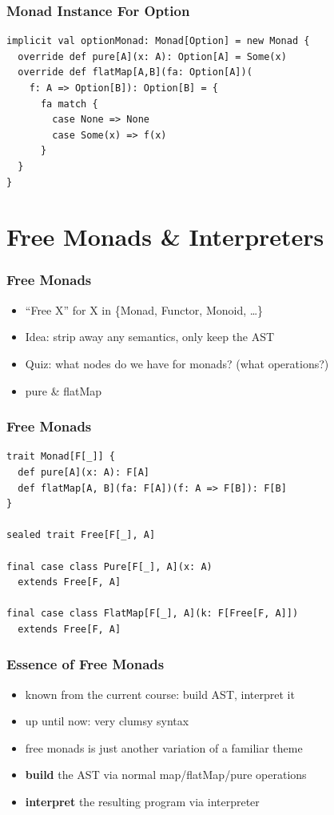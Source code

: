 \documentclass{beamer}
\begin{document}
\begin{frame}[fragile]
  \frametitle{Monad Instance For Option}
\begin{verbatim}
implicit val optionMonad: Monad[Option] = new Monad {
  override def pure[A](x: A): Option[A] = Some(x)
  override def flatMap[A,B](fa: Option[A])(
    f: A => Option[B]): Option[B] = {
      fa match {
        case None => None
        case Some(x) => f(x)
      }
  }
}
\end{verbatim}
\end{frame}

\section{Free Monads \& Interpreters}

\begin{frame}
  \frametitle{Free Monads}
  \begin{itemize}
  \item<1-> ``Free X'' for X in \{Monad, Functor, Monoid, \dots\}
  \item<1-> Idea: strip away any semantics, only keep the AST
  \item<1-> Quiz: what nodes do we have for monads? (what operations?)
  \item<2> pure \& flatMap
  \end{itemize}
\end{frame}

\begin{frame}[fragile]
  \frametitle{Free Monads}
\begin{verbatim}
trait Monad[F[_]] {
  def pure[A](x: A): F[A]
  def flatMap[A, B](fa: F[A])(f: A => F[B]): F[B]
}

sealed trait Free[F[_], A]

final case class Pure[F[_], A](x: A)
  extends Free[F, A]

final case class FlatMap[F[_], A](k: F[Free[F, A]])
  extends Free[F, A]
\end{verbatim}
\end{frame}

\begin{frame}
  \frametitle{Essence of Free Monads}
  \begin{itemize}
  \item known from the current course: build AST, interpret it
  \item up until now: very clumsy syntax
  \item free monads is just another variation of a familiar theme
  \item \textbf{build} the AST via normal map/flatMap/pure operations
  \item \textbf{interpret} the resulting program via interpreter
  \end{itemize}
\end{frame}
\end{document}
